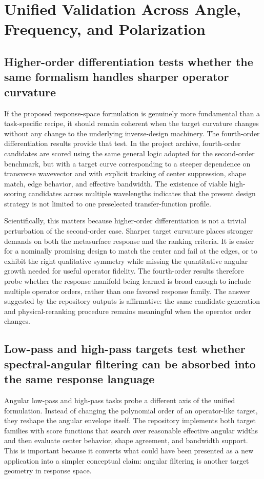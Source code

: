 \section{Unified Validation Across Angle, Frequency, and Polarization}

\subsection{Higher-order differentiation tests whether the same formalism handles sharper operator curvature}

If the proposed response-space formulation is genuinely more fundamental than a task-specific recipe, it should remain coherent when the target curvature changes without any change to the underlying inverse-design machinery. The fourth-order differentiation results provide that test. In the project archive, fourth-order candidates are scored using the same general logic adopted for the second-order benchmark, but with a target curve corresponding to a steeper dependence on transverse wavevector and with explicit tracking of center suppression, shape match, edge behavior, and effective bandwidth. The existence of viable high-scoring candidates across multiple wavelengths indicates that the present design strategy is not limited to one preselected transfer-function profile.

Scientifically, this matters because higher-order differentiation is not a trivial perturbation of the second-order case. Sharper target curvature places stronger demands on both the metasurface response and the ranking criteria. It is easier for a nominally promising design to match the center and fail at the edges, or to exhibit the right qualitative symmetry while missing the quantitative angular growth needed for useful operator fidelity. The fourth-order results therefore probe whether the response manifold being learned is broad enough to include multiple operator orders, rather than one favored response family. The answer suggested by the repository outputs is affirmative: the same candidate-generation and physical-reranking procedure remains meaningful when the operator order changes.

\subsection{Low-pass and high-pass targets test whether spectral-angular filtering can be absorbed into the same response language}

Angular low-pass and high-pass tasks probe a different axis of the unified formulation. Instead of changing the polynomial order of an operator-like target, they reshape the angular envelope itself. The repository implements both target families with score functions that search over reasonable effective angular widths and then evaluate center behavior, shape agreement, and bandwidth support. This is important because it converts what could have been presented as a new application into a simpler conceptual claim: angular filtering is another target geometry in response space.

